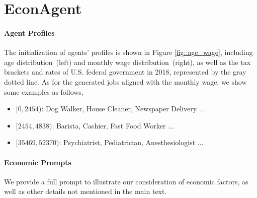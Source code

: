 \appendix
\section{EconAgent}
\paragraph{Agent Profiles} The initialization of agents' profiles is shown in Figure \ref{fig::age_wage}, including age distribution~(left) and monthly wage distribution~(right), as well as the tax brackets and rates of U.S. federal government in 2018, represented by the gray dotted line. As for the generated jobs aligned with the monthly wage, we show some examples as follows,
\begin{itemize}[leftmargin=*]
    \item \([0, 2454)\): Dog Walker, House Cleaner, Newspaper Delivery \(\ldots\)
    \item \([2454, 4838)\): Barista, Cashier, Fast Food Worker \(\ldots\)
    \item \([35469, 52370)\): Psychiatrist, Pediatrician, Anesthesiologist \(\ldots\)
\end{itemize}

\paragraph{Economic Prompts} We provide a full prompt to illustrate our consideration of economic factors, as well as other details not mentioned in the main text.

